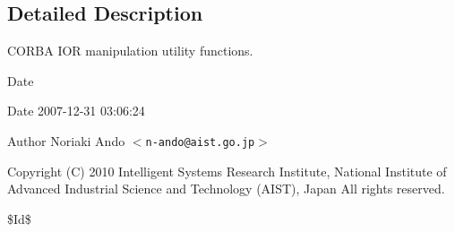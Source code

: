 \subsection{Detailed Description}
CORBA IOR manipulation utility functions. \begin{DoxyDate}{Date}

\end{DoxyDate}
\begin{DoxyParagraph}{Date}
2007-\/12-\/31 03:06:24 
\end{DoxyParagraph}
\begin{DoxyAuthor}{Author}
Noriaki Ando $<${\tt n-\/ando@aist.go.jp}$>$
\end{DoxyAuthor}
Copyright (C) 2010 Intelligent Systems Research Institute, National Institute of Advanced Industrial Science and Technology (AIST), Japan All rights reserved.

\$Id\$ 